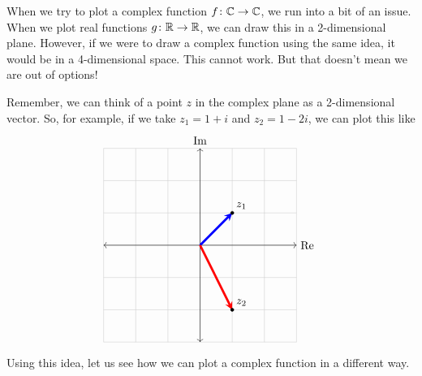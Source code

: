 When we try to plot a complex function $f\colon \mathbb{C} \to \mathbb{C}$, we run into a bit of an issue.  When we plot real functions $g\colon \mathbb{R}\to \mathbb{R}$, we can draw this in a 2-dimensional plane. However, if we were to draw a complex function using the same idea, it would be in a 4-dimensional space. This cannot work.  But that doesn't mean we are out of options!

Remember, we can think of a point $z$ in the complex plane as a 2-dimensional vector. So, for example, if we take $z_1=1+i$ and $z_2 = 1-2i$, we can plot this like
\[
        \begin{tikzpicture}
        \draw[thin,gray!40] (-3,-3) grid (3,3);
        \draw[<->] (-3,0)--(3,0) node[right]{$\RE$};
        \draw[<->] (0,-3)--(0,3) node[above]{$\IM$};
        \draw[line width=2pt,blue,-stealth](0,0)--(1,1) node[anchor=east] at (1,1){};
        \draw[line width=2pt,red,-stealth](0,0)--(1,-2) node[anchor=east] at (1,-2){};
        \foreach \Point/\PointLabel in {(1,1)/z_1, (1,-2)/z_2}
        \draw[fill=black] \Point circle (0.05) node[above right] {$\PointLabel$};
        \end{tikzpicture}
\]
Using this idea, let us see how we can plot a complex function in a different way.

